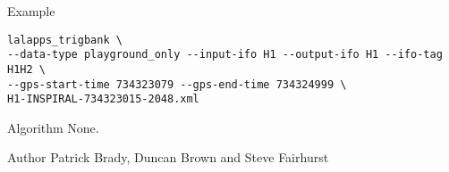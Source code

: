 \begin{entry}
\item[Example]
\begin{verbatim}
lalapps_trigbank \
--data-type playground_only --input-ifo H1 --output-ifo H1 --ifo-tag H1H2 \
--gps-start-time 734323079 --gps-end-time 734324999 \
H1-INSPIRAL-734323015-2048.xml
\end{verbatim}

\item[Algorithm]
None.

\item[Author] 
Patrick Brady, Duncan Brown and Steve Fairhurst
\end{entry}


